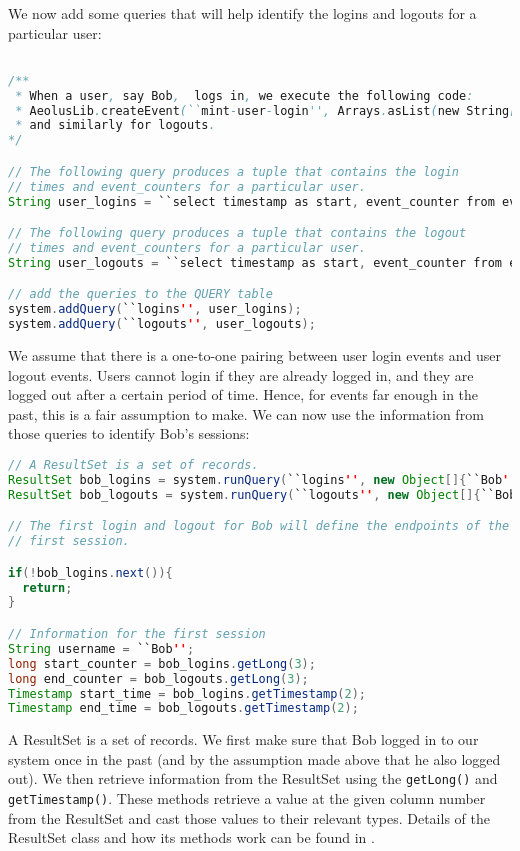 We now add some queries that will help identify the logins and logouts for a particular user:

\begin{lstlisting}[language=Java]

/**
 * When a user, say Bob,  logs in, we execute the following code:
 * AeolusLib.createEvent(``mint-user-login'', Arrays.asList(new String[]{``Bob''}));
 * and similarly for logouts.
*/

// The following query produces a tuple that contains the login
// times and event_counters for a particular user.
String user_logins = ``select timestamp as start, event_counter from events where app_op='mint-user-login' and app_arg[0]=?'';

// The following query produces a tuple that contains the logout
// times and event_counters for a particular user.
String user_logouts = ``select timestamp as start, event_counter from events where app_op='mint-user-login' and to_array(app_args)[0]=?'';

// add the queries to the QUERY table
system.addQuery(``logins'', user_logins);
system.addQuery(``logouts'', user_logouts);
\end{lstlisting}

\noindent
We assume that there is a one-to-one pairing between user login events and user logout events. Users cannot login if they are already logged in, and they are logged out after a certain period of time. Hence, for events far enough in the past, this is a fair assumption to make. We can now use the information from those queries to identify Bob's sessions:

\begin{lstlisting}[language=Java]
// A ResultSet is a set of records.
ResultSet bob_logins = system.runQuery(``logins'', new Object[]{``Bob''});
ResultSet bob_logouts = system.runQuery(``logouts'', new Object[]{``Bob''});

// The first login and logout for Bob will define the endpoints of the
// first session.

if(!bob_logins.next()){
  return;
}

// Information for the first session
String username = ``Bob'';
long start_counter = bob_logins.getLong(3);
long end_counter = bob_logouts.getLong(3);
Timestamp start_time = bob_logins.getTimestamp(2);
Timestamp end_time = bob_logouts.getTimestamp(2);
\end{lstlisting}

\noindent
A ResultSet is a set of records. We first make sure that Bob logged in to our system once in the past (and by the assumption made above that he also logged out). We then retrieve information from the ResultSet using the \lstinline$getLong()$ and \lstinline$getTimestamp()$. These methods retrieve a value at the given column number from the ResultSet and cast those values to their relevant types. Details of the ResultSet class and how its methods work can be found in \cite{jdoc}.

